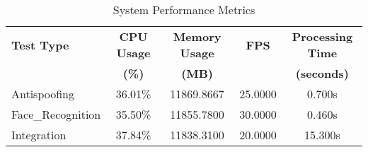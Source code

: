 \begin{table}[htbp]
\centering
\caption{System Performance Metrics}
\label{tab:performance_metrics}
\begin{tabular}{|l|c|c|c|c|}
\hline
\textbf{Test Type} & \textbf{CPU Usage} & \textbf{Memory Usage} & \textbf{FPS} & \textbf{Processing Time} \\
\textbf{} & \textbf{(\%)} & \textbf{(MB)} & \textbf{} & \textbf{(seconds)} \\
\hline
Antispoofing & 36.01\% & 11869.8667 & 25.0000 & 0.700s \\
\hline
Face_Recognition & 35.50\% & 11855.7800 & 30.0000 & 0.460s \\
\hline
Integration & 37.84\% & 11838.3100 & 20.0000 & 15.300s \\
\hline
\end{tabular}
\end{table}